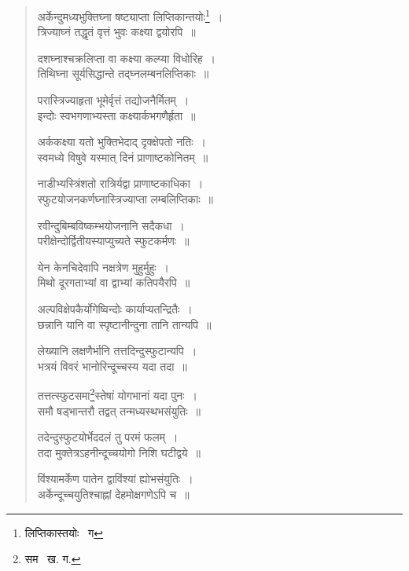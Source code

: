 \documentclass[11pt, openany]{book}
\begin{document}
\begin{quote}
{\qt अर्केन्दुमध्यभुक्तिघ्ना षष्ट्याप्ता लिप्तिकान्तयोः\renewcommand{\thefootnote}{१}\footnote{लिप्तिकास्तयोः \textendash\ ग}~।\\
त्रिज्याघ्नं तद्धृतं वृत्तं भुवः कक्ष्या द्वयोरपि~॥

दशघ्नाश्चक्रलिप्ता वा कक्ष्या कल्प्या विधोरिह~।\\
तिथिघ्ना सूर्यसिद्धान्ते तद्घ्नलम्बनलिप्तिकाः~॥
	
परास्त्रिज्याहृता भूमेर्वृत्तं तद्योजनैर्मितम्~।\\
इन्दोः स्वभगणाभ्यस्ता कक्ष्यार्कभगणैर्हृता~॥
	
अर्ककक्ष्या यतो भुक्तिभेदाद् दृक्क्षेपतो नतिः~।\\
स्वमध्ये विषुवे यस्मात् दिनं प्राणाष्टकोनितम्~॥
	
नाडीभ्यस्त्रिंशतो रात्रिर्यद्वा प्राणाष्टकाधिका~।\\
स्फुटयोजनकर्णघ्नास्त्रिज्याप्ता लम्बलिप्तिकाः~॥
	
रवीन्दुबिम्बविष्कम्भयोजनानि सदैकधा~।\\
परीक्षेन्दोर्द्वितीयस्याप्युच्यते स्फुटकर्मणः~॥
	
येन केनचिदेवापि नक्षत्रेण मुहुर्मुहुः~।\\
मिथो दूरगताभ्यां वा द्वाभ्यां कतिपयैरपि~॥
	
अल्पविक्षेपकैर्योगेष्विन्दोः कार्याप्यतन्द्रितैः~।\\
छन्नानि यानि वा स्पृष्टानीन्दुना तानि तान्यपि~॥
	
लेख्यानि लक्षणैर्भानि तत्तदिन्दुस्फुटान्यपि~।\\
भत्रयं विवरं भानोरिन्दूच्चस्य यदा तदा~॥

तत्तत्स्फुटसमा\renewcommand{\thefootnote}{२}\footnote{सम \textendash\ ख. ग.}स्तेषां योगभानां यदा पुनः~।\\
समौ षड्भान्तरौ तद्वत् तन्मध्यस्थभसंयुतिः~॥
	
तदेन्दुस्फुटयोर्भेददलं तु परमं फलम्~।\\
तदा मुक्तेत्रऽहनीन्दूच्चयोगो निशि घटीद्वये~॥
	
विंश्यामर्केण पातेन द्वाविंश्यां ह्योभसंयुतिः~।\\
अर्केन्दूच्चयुतिश्चाह्नां देहमोक्षगणेऽपि च~॥} 
\end{quote}

\newpage
\end{document}
